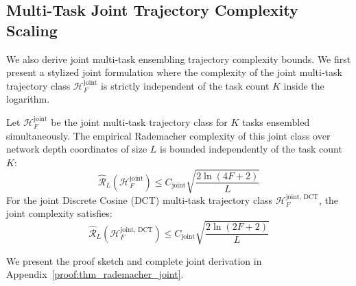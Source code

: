 \subsection{Multi-Task Joint Trajectory Complexity Scaling}
We also derive joint multi-task ensembling trajectory complexity bounds. We first present a stylized joint formulation where the complexity of the joint multi-task trajectory class $\mathcal{H}_F^{\text{joint}}$ is strictly independent of the task count $K$ inside the logarithm.
\begin{theorem}
\label{thm:rademacher_joint}
Let $\mathcal{H}_F^{\text{joint}}$ be the joint multi-task trajectory class for $K$ tasks ensembled simultaneously. The empirical Rademacher complexity of this joint class over network depth coordinates of size $L$ is bounded independently of the task count $K$:
\begin{equation}
    \widehat{\mathcal{R}}_L(\mathcal{H}_F^{\text{joint}}) \le C_{\text{joint}} \sqrt{\frac{2 \ln(4F+2)}{L}}
\end{equation}
For the joint Discrete Cosine (DCT) multi-task trajectory class $\mathcal{H}_F^{\text{joint, DCT}}$, the joint complexity satisfies:
\begin{equation}
    \widehat{\mathcal{R}}_L(\mathcal{H}_F^{\text{joint, DCT}}) \le C_{\text{joint}} \sqrt{\frac{2 \ln(2F+2)}{L}}
\end{equation}
\end{theorem}
We present the proof sketch and complete joint derivation in Appendix~\ref{proof:thm_rademacher_joint}.

